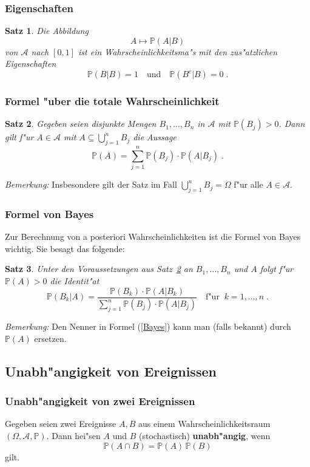 \documentclass[ngerman,draft,parskip=half,twoside]{scrartcl}
\newtheorem{thm}{Satz}[section]
\newcommand*{\Algeb}{\mathcal{A}}   %
\newcommand*{\WKM}{\mathbb{P}}      %
\begin{document}
\subsubsection{Eigenschaften}
\begin{thm}
Die Abbildung
$$
A\mapsto \WKM(A|B)
$$
von $\Algeb$ nach $[0,1]$ ist ein Wahrscheinlichkeitsma"s mit den zus"atzlichen Eigenschaften
$$
\WKM(B|B)=1\quad\mbox{und}\quad\WKM(B^c|B)=0\;.
$$
\end{thm}
\subsubsection{Formel "uber die totale Wahrscheinlichkeit}
\begin{thm}
\label{total}
Gegeben seien disjunkte Mengen $B_1,\ldots,B_n$ in $\Algeb$ mit
$\WKM(B_j)>0$. Dann gilt f"ur $A\in \Algeb$ mit $A\subseteq\bigcup_{j=1}^n B_j$
die Aussage
$$
\WKM(A)=\sum_{j=1}^n\WKM(B_j)\cdot\WKM(A|B_j)\;.
$$
\end{thm}
\textit{Bemerkung:} Insbesondere gilt der Satz im Fall $\bigcup_{j=1}^n B_j=\Omega$
f"ur alle $A\in\Algeb$.
\subsubsection{Formel von Bayes}
Zur Berechnung von a posteriori Wahrscheinlichkeiten ist die Formel von
Bayes wichtig. Sie besagt das folgende$\colon$
\begin{thm}
Unter den Voraussetzungen aus Satz~\ref{total} an $B_1,\ldots,B_n$ und $A$ folgt
f"ur
$\WKM(A)>0$ die Identit"at
\begin{equation}
\label{Bayes}
\WKM(B_k|A)=\frac{\WKM(B_k)\cdot\WKM(A|B_k)}{\sum_{j=1}^n
\WKM(B_j)\cdot\WKM(A|B_j)}\quad\mbox{f"ur}\;\;k=1,\ldots,n\;.
\end{equation}
\end{thm}
\textit{Bemerkung:} Den Nenner in Formel (\ref{Bayes}) kann man (falls bekannt) durch $\WKM(A)$
ersetzen.
\subsection{Unabh"angigkeit von Ereignissen}
\subsubsection{Unabh"angigkeit von zwei Ereignissen}
Gegeben seien zwei Ereignisse $A,B$ aus einem Wahrscheinlichkeitsraum $(\Omega,\Algeb,\WKM)$.
Dann hei"sen $A$ und $B$ (stochastisch) \textbf{unabh"angig}, wenn
$$
\WKM(A\cap B)=\WKM(A)\,\WKM(B)
$$
gilt.
\end{document}
